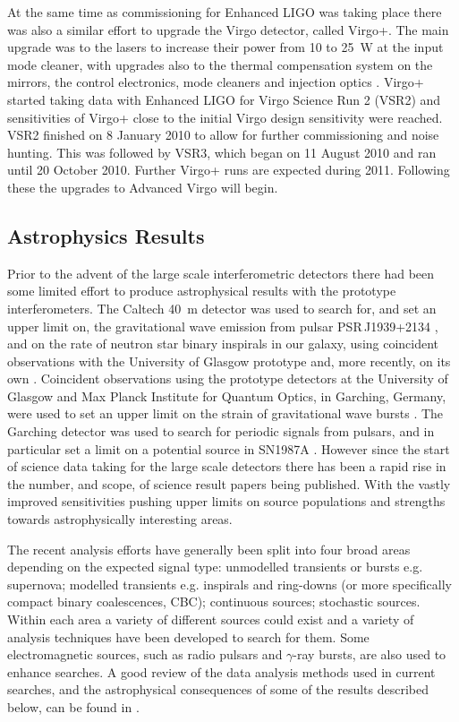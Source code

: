 \documentclass{article}
\begin{document}
At the same time as commissioning for Enhanced LIGO was taking place there was
also a similar effort to upgrade the Virgo detector, called Virgo+. The main
upgrade was to the lasers to increase their power from 10 to 25~W at the input
mode cleaner, with upgrades also to the thermal compensation system on the
mirrors, the control electronics, mode cleaners and injection optics
\cite{Acernese:2008b, AdVwhitepaper}. Virgo+ started taking data with Enhanced
LIGO for Virgo Science Run 2 (VSR2) and sensitivities of Virgo+ close to the
initial Virgo design sensitivity were reached. VSR2 finished on 8 January 2010
to allow for further commissioning and noise hunting. This was followed by VSR3,
which began on 11 August 2010 and ran until 20 October 2010. Further Virgo+
runs are expected during 2011. Following these the upgrades to Advanced
Virgo will begin.

\subsection{Astrophysics Results}\label{subsection:results}
Prior to the advent of the large scale interferometric detectors there had been
some limited effort to produce astrophysical results with the prototype
interferometers. The Caltech 40~m detector was used to search for, and set an
upper limit on, the gravitational wave emission from pulsar PSR\,J1939+2134
\cite{Hereld:1984}, and on the rate of neutron star binary inspirals in our
galaxy, using coincident observations with the University of Glasgow prototype
\cite{Smith:1988} and, more recently, on its own \cite{Allen:1999}. Coincident
observations using the prototype detectors at the University of Glasgow and Max
Planck Institute for Quantum Optics, in Garching, Germany, were used to set an
upper limit on the strain of gravitational wave bursts \cite{Nicholson:1996}.
The Garching detector was used to search for periodic signals from pulsars, and
in particular set a limit on a potential source in SN1987A \cite{Niebauer:1993}.
However since the start of science data taking for the large scale detectors
there has been a rapid rise in the number, and scope, of science result papers
being published. With the vastly improved sensitivities pushing upper limits on
source populations and strengths towards astrophysically interesting areas.

The recent analysis efforts have generally been split into four broad areas
depending on the expected signal type: unmodelled transients or bursts e.g.
supernova; modelled transients e.g. inspirals and ring-downs (or more
specifically compact binary coalescences, CBC); continuous sources; stochastic
sources. Within each area a variety of different sources could exist and a
variety of analysis techniques have been developed to search for them. Some
electromagnetic sources, such as radio pulsars and $\gamma$-ray bursts, are also
used to enhance searches. A good review of the data analysis methods used in
current searches, and the astrophysical consequences of some of the results
described below, can be found in \cite{Sathyaprakash:2009}.
\end{document}
